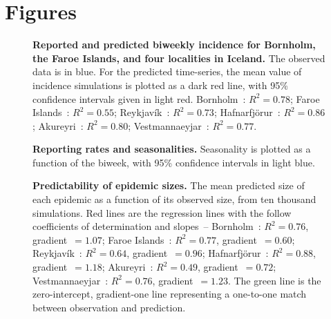 \documentclass[10pt]{article}
\begin{document}
\section*{Figures}

\begin{figure}[!h]
\centering
\caption{\textbf{Reported and predicted biweekly incidence for Bornholm, the Faroe Islands, and four localities in Iceland.} The observed data is in blue. For the predicted time-series, the mean value of incidence simulations is plotted as a dark red line, with 95\% confidence intervals given in light red. Bornholm~: $R^2=0.78$; Faroe Islands~: $R^2=0.55$; Reykjav\'{i}k~: $R^2=0.73$; Hafnarfj\"{o}r\dh{}ur~: $R^2=0.86$; Akureyri~: $R^2=0.80$; Vestmannaeyjar~: $R^2=0.77$.}
\label{figIncidence}
\end{figure}



\begin{figure}[!h]
\centering
\caption{\textbf{Reporting rates and seasonalities.} Seasonality is plotted as a function of the biweek, with 95\% confidence intervals in light blue.}
\label{figSims}
\end{figure}


\begin{figure}[!h]
\centering
\caption{\textbf{Predictability of epidemic sizes.} The mean predicted size of each epidemic as a function of its observed size, from ten thousand simulations. Red lines are the regression lines with the follow coefficients of determination and slopes~-- Bornholm~: $R^2=0.76$, gradient~$=1.07$; Faroe Islands~: $R^2=0.77$, gradient~$=0.60$; Reykjav\'{i}k~: $R^2=0.64$, gradient~$=0.96$; Hafnarfj\"{o}r\dh{}ur~: $R^2=0.88$, gradient~$=1.18$; Akureyri~: $R^2 = 0.49$, gradient~$=0.72$; Vestmannaeyjar~: $R^2=0.76$, gradient~$=1.23$. The green line is the zero-intercept, gradient-one line representing a one-to-one match between observation and prediction.}
\label{fig_sizes}
\end{figure}
\end{document}
